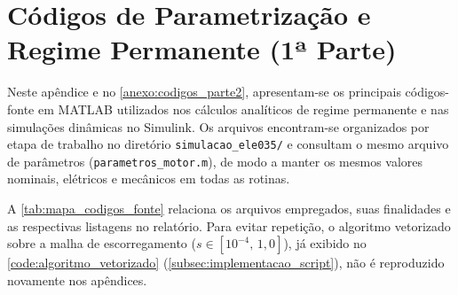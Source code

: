 \chapter{Códigos de Parametrização e Regime Permanente (1ª Parte)}\label{anexo:codigos_parte1}

Neste apêndice e no \cref{anexo:codigos_parte2}, apresentam-se os principais códigos-fonte em MATLAB utilizados nos cálculos analíticos de regime permanente e nas simulações dinâmicas no Simulink. Os arquivos encontram-se organizados por etapa de trabalho no diretório \texttt{simulacao\_\allowbreak{}ele035/} e consultam o mesmo arquivo de parâmetros (\texttt{parametros\_\allowbreak{}motor.m}), de modo a manter os mesmos valores nominais, elétricos e mecânicos em todas as rotinas.

A \cref{tab:mapa_codigos_fonte} relaciona os arquivos empregados, suas finalidades e as respectivas listagens no relatório. Para evitar repetição, o algoritmo vetorizado sobre a malha de escorregamento ($s \in [10^{-4}, \, 1{,}0]$), já exibido no \cref{code:algoritmo_vetorizado} (\cref{subsec:implementacao_script}), não é reproduzido novamente nos apêndices.

